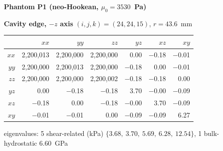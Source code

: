 \documentclass[11pt,letterpaper]{article}
\begin{document}
\vspace{8pt}
\begin{center}\small
\textbf{Phantom P1 (neo-Hookean, $\mu_0 = 3530$~Pa)}
\end{center}

\textbf{Cavity edge, $-z$ axis} \quad $(i,j,k)=(24,24,15)$, $r=43.6$~mm
\begin{center}\scriptsize
\begin{tabular}{r|rrrrrr}
\toprule
 & $xx$ & $yy$ & $zz$ & $yz$ & $xz$ & $xy$ \\
\midrule
$xx$ & \phantom{$-$}2,200,013 & \phantom{$-$}2,200,000 & \phantom{$-$}2,200,000 & \phantom{$-$}0.00 & $-$0.18 & $-$0.01 \\
$yy$ & \phantom{$-$}2,200,000 & \phantom{$-$}2,200,013 & \phantom{$-$}2,200,000 & $-$0.18 & \phantom{$-$}0.00 & $-$0.01 \\
$zz$ & \phantom{$-$}2,200,000 & \phantom{$-$}2,200,000 & \phantom{$-$}2,200,002 & $-$0.18 & $-$0.18 & \phantom{$-$}0.00 \\
$yz$ & \phantom{$-$}0.00 & $-$0.18 & $-$0.18 & \phantom{$-$}3.70 & $-$0.00 & $-$0.09 \\
$xz$ & $-$0.18 & \phantom{$-$}0.00 & $-$0.18 & $-$0.00 & \phantom{$-$}3.70 & $-$0.09 \\
$xy$ & $-$0.01 & $-$0.01 & \phantom{$-$}0.00 & $-$0.09 & $-$0.09 & \phantom{$-$}6.27 \\
\bottomrule
\end{tabular}
\end{center}
\vspace{-4pt}\noindent\hspace{1em}\scriptsize eigenvalues: 5 shear-related (kPa) $\{3.68,\ 3.70,\ 5.69,\ 6.28,\ 12.54\}$, 1 bulk-hydrostatic $6.60$~GPa
\end{document}

